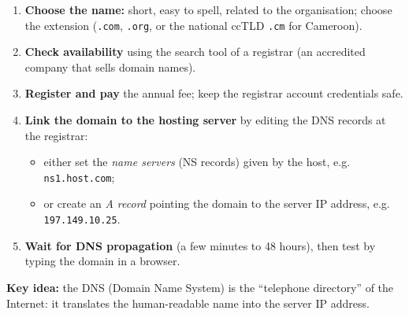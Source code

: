 \documentclass[11pt]{article}
\begin{document}
\begin{methode}
\begin{enumerate}
\item \textbf{Choose the name:} short, easy to spell, related to the organisation; choose the extension (\texttt{.com}, \texttt{.org}, or the national ccTLD \texttt{.cm} for Cameroon).
\item \textbf{Check availability} using the search tool of a registrar (an accredited company that sells domain names).
\item \textbf{Register and pay} the annual fee; keep the registrar account credentials safe.
\item \textbf{Link the domain to the hosting server} by editing the DNS records at the registrar:
\begin{itemize}
\item either set the \emph{name servers} (NS records) given by the host, e.g. \texttt{ns1.host.com};
\item or create an \emph{A record} pointing the domain to the server IP address, e.g. \texttt{197.149.10.25}.
\end{itemize}
\item \textbf{Wait for DNS propagation} (a few minutes to 48 hours), then test by typing the domain in a browser.
\end{enumerate}
\textbf{Key idea:} the DNS (Domain Name System) is the ``telephone directory'' of the Internet: it translates the human-readable name into the server IP address.
\end{methode}
\end{document}
